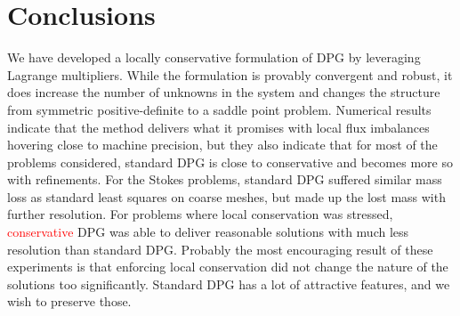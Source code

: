 \documentclass[letterpaper]{article}
\newcommand{\red}[1]{\textcolor{red}{#1}}
\begin{document}
\section{Conclusions}
We have developed a locally conservative formulation of DPG by leveraging
Lagrange multipliers. While the formulation is provably convergent and robust, it does
increase the number of unknowns in the system and changes the structure from
symmetric positive-definite to a saddle point problem. Numerical results
indicate that the method delivers what it promises with local flux imbalances
hovering close to machine precision, but they also indicate that for most of the
problems considered, standard DPG is close to conservative and becomes more so
with refinements. For the Stokes problems, standard DPG suffered similar mass
loss as standard least squares on coarse meshes, but made up the lost mass with further
resolution. For problems where local conservation was stressed,
\red{conservative} DPG was able to deliver reasonable solutions with much less
resolution than standard DPG.
Probably the most encouraging result of these experiments is
that enforcing local conservation did not change the nature of the solutions
too significantly. Standard DPG has a lot of attractive features, and we wish
to preserve those.




\end{document}
